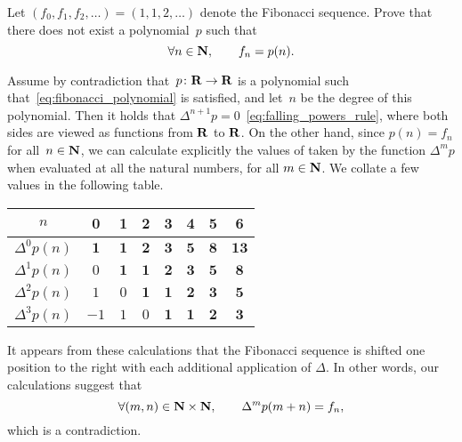 \begin{exercise}
    Let $(f_0, f_1, f_2, \dotsc) = (1, 1, 2, \dotsc)$ denote the Fibonacci sequence.
    Prove that there does not exist a polynomial~$p$ such that
    \begin{equation}
        \label{eq:fibonacci_polynomial}
        \forall n \in \mathbf N, \qquad
        f_n = p(n).
    \end{equation}
\end{exercise}
\begin{solution}
    Assume by contradiction that~$p\colon \mathbf R \to \mathbf R$ is a polynomial such that~\eqref{eq:fibonacci_polynomial} is satisfied,
    and let~$n$ be the degree of this polynomial.
    Then it holds that $\Delta^{n+1} p = 0$~\eqref{eq:falling_powers_rule},
    where both sides are viewed as functions from $\mathbf R$ to $\mathbf R$.
    On the other hand,
    since $p(n) = f_n$ for all~$n\in \mathbf N$,
    we can calculate explicitly the values of taken by the function $\Delta^{m} p$ when evaluated at all the natural numbers,
    for all $m \in \mathbf N$.
    We collate a few values in the following table.
    \begin{center}
    \begin{tabular}{|c|c|c|c|c|c|c|c|}
        \hline
        $n$    & 0 & 1 & 2 & 3 & 4 & 5 & 6 \\ \hline
        $\Delta^0 p(n)$ & $\mathbf{1}$ & $\mathbf{1}$ & $\mathbf{2}$ & $\mathbf{3}$ & $\mathbf{5}$ & $\mathbf{8}$ & $\mathbf{13}$ \\ \hline
        $\Delta^1 p(n)$ & $0$ & $\mathbf{1}$ & $\mathbf{1}$ & $\mathbf{2}$ & $\mathbf{3}$ & $\mathbf{5}$ & $\mathbf{8}$ \\ \hline
        $\Delta^2 p(n)$ & $1$ & $0$ & $\mathbf{1}$ & $\mathbf{1}$ & $\mathbf{2}$ & $\mathbf{3}$ & $\mathbf{5}$ \\ \hline
        $\Delta^3 p(n)$ & $-1$ & $1$ & $0$ & $\mathbf{1}$ & $\mathbf{1}$ & $\mathbf{2}$ & $\mathbf{3}$ \\ \hline
    \end{tabular}
    \end{center}
    It appears from these calculations that the Fibonacci sequence is shifted one position to the right with each additional application of $\Delta$.
    In other words, our calculations suggest that
    \begin{equation}
        \label{eq:difference_fib}
        \forall (m, n) \in \mathbf N \times \mathbf N,
        \qquad \Delta^m p(m+n) = f_n,
    \end{equation}
    which is a contradiction.

\end{solution}
